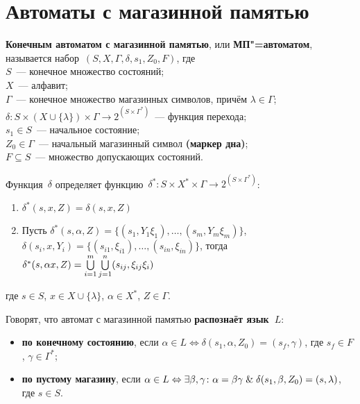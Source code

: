 \section{Автоматы с магазинной памятью}
  \textbf{Конечным автоматом с магазинной памятью}, или \textbf{МП"=автоматом}, называется набор~$(S, X, \Gamma, \delta, s_1, Z_0, F)$, где\\
$S$~--- конечное множество состояний;\\
$X$~--- алфавит;\\
$\Gamma$~--- конечное множество магазинных символов, причём $\lambda \in \Gamma$;\\
$\delta \colon S \times (X \cup \{ \lambda \}) \times \Gamma \to 2^{(S \times \Gamma^*)}$~--- функция перехода;\\
$s_1 \in S$~--- начальное состояние;\\
$Z_0 \in \Gamma$~--- начальный магазинный символ \textbf{(маркер дна)};\\
$F \subseteq S$~--- множество допускающих состояний.

Функция~$\delta$ определяет функцию~$\delta^* \colon S \times X^* \times \Gamma \to 2^{(S \times \Gamma^*)}$:
\begin{enumerate}
	\item $\delta^*(s, x, Z) = \delta(s, x, Z)$
	\item Пусть $\delta^*(s, \alpha, Z) = \{ (s_1, Y_1 \xi_1), \ldots, (s_m, Y_m \xi_m) \}$,
	$\delta(s_i, x, Y_i) = \{ (s_{i1}, \xi_{i1}), \ldots, (s_{in}, \xi_{in}) \}$,
	тогда
	$\delta^*(s, \alpha x, Z) \opbr= \bigcup\limits_{i=1}^m \bigcup\limits_{j=1}^n (s_{ij}, \xi_{ij} \xi_i)$
\end{enumerate}
где $s \in S$, $x \in X \cup \{ \lambda \}$, $\alpha \in X^*$, $Z \in \Gamma$.

Говорят, что автомат с магазинной памятью \textbf{распознаёт язык~$L$}:
\begin{itemize}
	\item \textbf{по конечному состоянию}, если $\alpha \in L \Leftrightarrow \delta(s_1, \alpha, Z_0) = (s_f, \gamma)$, где $s_f \in F$, $\gamma \in \Gamma^*$;
	\item \textbf{по пустому магазину}, если $\alpha \in L \Leftrightarrow \exists \beta, \gamma \colon \alpha = \beta \gamma \mathrel{\&} \delta(s_1, \beta, Z_0) = (s, \lambda)$, где $s \in S$.
\end{itemize}

